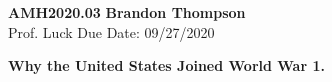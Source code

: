 \noindent
\textbf{AMH2020.03} \hfill \textbf{Brandon Thompson} \\
\normalsize Prof. Luck \hfill Due Date: 09/27/2020 \\

\begin{center}
\textbf{Why the United States Joined World War 1.}
\end{center}